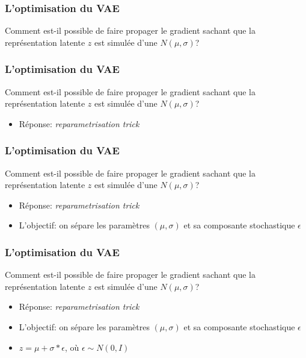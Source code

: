 \documentclass{beamer}
\begin{document}
	\begin{frame}
		\frametitle{L'optimisation du VAE}
		Comment est-il possible de faire propager le gradient sachant que la représentation latente $z$ est simulée d'une $N(\mu,\sigma)$?
	\end{frame}

	\begin{frame}
		\frametitle{L'optimisation du VAE}
		Comment est-il possible de faire propager le gradient sachant que la représentation latente $z$ est simulée d'une $N(\mu,\sigma)$?
		
		\begin{itemize}
			\item Réponse: \textit{reparametrisation trick}
		\end{itemize}
		
	\end{frame}

	\begin{frame}
		\frametitle{L'optimisation du VAE}
		Comment est-il possible de faire propager le gradient sachant que la représentation latente $z$ est simulée d'une $N(\mu,\sigma)$?
		
		\begin{itemize}
			\item Réponse: \textit{reparametrisation trick}
			\item L'objectif: on sépare les paramètres $(\mu, \sigma)$ et sa composante stochastique $\epsilon$
		\end{itemize}
		
	\end{frame}

	\begin{frame}
		\frametitle{L'optimisation du VAE}
		Comment est-il possible de faire propager le gradient sachant que la représentation latente $z$ est simulée d'une $N(\mu,\sigma)$?
		
		\begin{itemize}
			\item Réponse: \textit{reparametrisation trick}
			\item L'objectif: on sépare les paramètres $(\mu, \sigma)$ et sa composante stochastique $\epsilon$
			\item $z = \mu + \sigma * \epsilon$, où $\epsilon \sim N(0,I)$
		\end{itemize}
		
	\end{frame}
\end{document}
